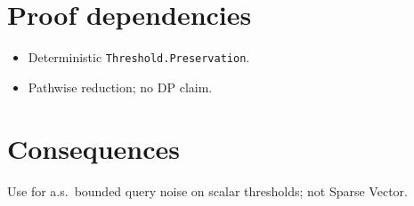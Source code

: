 \documentclass[12pt]{article}
\theoremstyle{plain}
\theoremstyle{definition}
\theoremstyle{remark}
\begin{document}
\section{Proof dependencies}
{\raggedright\sloppy
\begin{itemize}
\item Deterministic \texttt{Threshold.Preservation}.
\item Pathwise reduction; no DP claim.
\end{itemize}
\par}

\section{Consequences}
{\raggedright\sloppy
Use for a.s.\ bounded query noise on scalar thresholds; not Sparse Vector.
\par}
\end{document}
